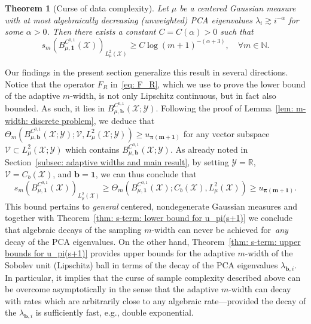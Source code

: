 \documentclass[namedate,webpdf]{ima-authoring-template-blank}
\newcounter{counter}
\numberwithin{counter}{section}
\numberwithin{equation}{section}
\theoremstyle{plain}
\newtheorem{theorem}[counter]{Theorem}
\theoremstyle{definition}
\newcommand*{\cV}{\mathcal{V}}
\newcommand*{\cX}{\mathcal{X}}
\newcommand*{\cY}{\mathcal{Y}}
\newcommand*{\bbN}{\mathbb{N}}
\newcommand*{\bbR}{\mathbb{R}}
\theoremstyle{thmstyletwo}
\begin{document}
\begin{theorem}[Curse of data complexity]
\label{thm: curse of data complexity}
    Let \(\mu\) be a centered Gaussian measure with at most algebraically decreasing (unweighted) PCA eigenvalues \(\lambda_i \gtrsim i^{-\alpha}\) for some \(\alpha > 0\). Then there exists a constant \(C = C(\alpha) > 0\) such that
    \[
    s_m(B_{\mu, \bm{1}}^{C^{0,1}}(\cX))_{L_{\mu}^2(\cX)} \geq C \log(m + 1)^{-(\alpha + 3)}, \quad \forall m \in \bbN.
    \]
\end{theorem}

Our findings in the present section generalize this result in several directions. Notice that the operator \(F_R\) in~\eqref{eq: F_R}, which we use to prove the lower bound of the adaptive \(m\)-width, is not only Lipschitz continuous, but in fact also bounded. As such, it lies in \( B_{\mu, \bm{b}}^{C^{0,1}}(\cX; \cY) \). Following the proof of Lemma~\ref{lem: m-width: discrete problem}, we deduce that \( \Theta_m(B_{\mu, \bm{b}}^{C^{0,1}}(\cX; \cY); \cV, L_{\mu}^2(\cX; \cY)) \geq u_{\bm{\pi(m + 1)}} \) for any vector subspace \( \cV \subset L^2_{\mu}(\cX; \cY) \) which contains \( B_{\mu, \bm{b}}^{C^{0,1}}(\cX; \cY) \). As already noted in Section~\ref{subsec: adaptive widths and main result}, by setting \( \cY = \bbR \), \( \cV = C_b(\cX) \), and \( \bm{b} = \bm{1} \), we can thus conclude that
\[
s_m(B_{\mu, \bm{1}}^{C^{0,1}}(\cX))_{L_{\mu}^2(\cX)} \geq \Theta_m(B_{\mu, \bm{1}}^{C^{0,1}}(\cX); C_b(\cX), L_{\mu}^2(\cX)) \geq u_{\bm{\pi(m + 1)}}.
\]
This bound pertains to \emph{general} centered, nondegenerate Gaussian measures and together with Theorem~\ref{thm: s-term: lower bound for u_pi(s+1)} we conclude that algebraic decays of the sampling \(m\)-width can never be achieved for~\emph{any} decay of the PCA eigenvalues. 
On the other hand, Theorem~\ref{thm: s-term: upper bounds for u_pi(s+1)} provides upper bounds for the adaptive \(m\)-width of the Sobolev unit (Lipschitz) ball in terms of the decay of the PCA eigenvalues \(\lambda_{\bm{b}, i}\). In particular, it implies that the curse of sample complexity described above can be overcome asymptotically in the sense that the adaptive \(m\)-width can decay with rates which are arbitrarily close to any algebraic rate---provided the decay of the \(\lambda_{\bm{b}, i}\) is sufficiently fast, e.g., double exponential.






\end{document}
